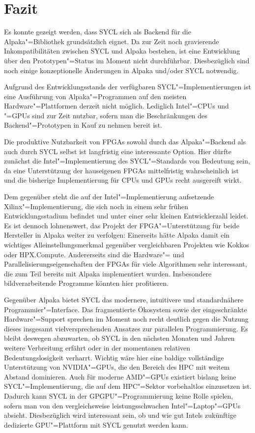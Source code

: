 \chapter{Fazit}
\label{fazit}

Es konnte gezeigt werden, dass SYCL sich als Backend für die Alpaka"=Bibliothek
grundsätzlich eignet. Da zur Zeit noch gravierende Inkompatibilitäten zwischen
SYCL und Alpaka bestehen, ist eine Entwicklung über den Prototypen"=Status
im Moment nicht durchführbar. Diesbezüglich sind noch einige konzeptionelle
Änderungen in Alpaka und/oder SYCL notwendig.

Aufgrund des Entwicklungsstands der verfügbaren SYCL"=Implementierungen ist eine
Ausführung von Alpaka"=Programmen auf den meisten Hardware"=Plattformen derzeit
nicht möglich. Lediglich Intel"=CPUs und "=GPUs sind zur Zeit nutzbar, sofern
man die Beschränkungen des Backend"=Prototypen in Kauf zu nehmen bereit ist.

Die produktive Nutzbarkeit von FPGAs sowohl durch das Alpaka"=Backend als auch
durch SYCL selbst ist langfristig eine interessante Option. Hier dürfte zunächst
die Intel"=Implementierung des SYCL"=Standards von Bedeutung sein, da eine
Unterstützung der hauseigenen FPGAs mittelfristig wahrscheinlich ist und die
bisherige Implementierung für CPUs und GPUs recht ausgereift wirkt.

Dem gegenüber steht die auf der Intel"=Implementierung aufsetzende
Xilinx"=Implementierung, die sich noch in einem sehr frühen Entwicklungsstadium
befindet und unter einer sehr kleinen Entwicklerzahl leidet. Es ist dennoch
lohnenswert, das Projekt der FPGA"=Unterstützung für beide Hersteller in Alpaka
weiter zu verfolgen: Einerseits hätte Alpaka damit ein wichtiges
Alleinstellungsmerkmal gegenüber vergleichbaren Projekten wie Kokkos oder
HPX.Compute. Andererseits sind die Hardware"= und Parallelisierungseigenschaften
der FPGAs für viele Algorithmen sehr interessant, die zum Teil bereits mit
Alpaka implementiert wurden. Insbesondere bildverarbeitende Programme könnten
hier profitieren.

Gegenüber Alpaka bietet SYCL das modernere, intuitivere und standardnähere
Programmier"=Interface. Das fragmentierte Ökosystem sowie der eingeschränkte
Hardware"=Support sprechen im Moment noch recht deutlich gegen die Nutzung
dieses insgesamt vielversprechenden Ansatzes zur parallelen Programmierung. Es
bleibt deswegen abzuwarten, ob SYCL in den nächsten Monaten und Jahren weitere
Verbreitung erfährt oder in der momentanen relativen Bedeutungslosigkeit
verharrt. Wichtig wäre hier eine baldige vollständige Unterstützung von
NVIDIA"=GPUs, die den Bereich des HPC mit weitem Abstand dominieren. Auch für
moderne AMD"=GPUs existiert bislang keine SYCL"=Implementierung, die auf dem
HPC"=Sektor vorbehaltlos einzusetzen ist. Dadurch kann SYCL in der
GPGPU"=Programmierung keine Rolle spielen, sofern man von den vergleichsweise
leistungsschwachen Intel"=Laptop"=GPUs absieht. Diesbezüglich wird interessant
sein, ob und wie gut Intels zukünftige dedizierte GPU"=Plattform mit SYCL
genutzt werden kann.
